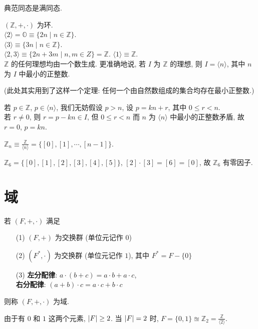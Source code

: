 \documentclass{note}
\begin{document}
典范同态是满同态.

\begin{eg}
    $(\mathbb{Z},+,\cdot)$ 为环.\\
    $\langle 2\rangle=\mathbb{O}\equiv\{2n\mid n\in\mathbb{Z}\}$.\\
    $\langle 3\rangle\equiv\{3n\mid n\in\mathbb{Z}\}$.\\
    $\langle 2,3\rangle\equiv\{2n+3m\mid n,m\in Z\}=\mathbb{Z}$.
    $\langle 1\rangle\equiv\mathbb{Z}$.\\
    $\mathbb{Z}$ 的任何理想均由一个数生成. 更准确地说, 若 $I$ 为 $\mathbb{Z}$ 的理想, 则 $I=\langle n\rangle$, 其中 $n$ 为 $I$ 中最小的正整数.
\end{eg}
(此处其实用到了这样一个定理: 任何一个由自然数组成的集合均存在最小正整数.)
\begin{pf}
    若 $p\in\mathbb{Z}$, $p\in\langle n\rangle$, 我们无妨假设 $p>n$, 设 $p=kn+r$, 其中 $0\leq r<n$.\\
    若 $r\neq 0$, 则 $r=p-kn\in I$, 但 $0\leq r<n$ 而 $n$ 为 $\langle n\rangle$ 中最小的正整数矛盾, 故 $r=0$, $p=kn$.
\end{pf}

\begin{df}[剩余类环]
    $\mathbb{Z}_n\equiv\frac{\mathbb{Z}}{\langle n\rangle}=\{[0],[1],\cdots,[n-1]\}$.
\end{df}

\begin{eg}
    $\mathbb{Z}_6=\{[0],[1],[2],[3],[4],[5]\}$, $[2]\cdot[3]=[6]=[0]$, 故 $\mathbb{Z}_6$ 有零因子.
\end{eg}

\section{域}
\begin{df}[域]
    若 $(F,+,\cdot)$ 满足
    \begin{itemize}
        \item[(1)] $(F,+)$ 为交换群 (单位元记作 $0$)
        \item[(2)] $(F^*,\cdot)$ 为交换群 (单位元记作 $1$), 其中 $F^*=F-\{0\}$
        \item[(3)] \textbf{左分配律}: $a\cdot(b+c)=a\cdot b+a\cdot c$,\\
        \textbf{右分配律}: $(a+b)\cdot c=a\cdot c+b\cdot c$
    \end{itemize}
    则称 $(F,+,\cdot)$ 为域.
\end{df}

由于有 $0$ 和 $1$ 这两个元素, $\left\lvert F\right\rvert\geq 2$. 当 $\left\lvert F\right\rvert=2$ 时, $F=\{0,1\}\approxeq\mathbb{Z}_2=\frac{\mathbb{Z}}{\langle 2\rangle}$.
\end{document}

